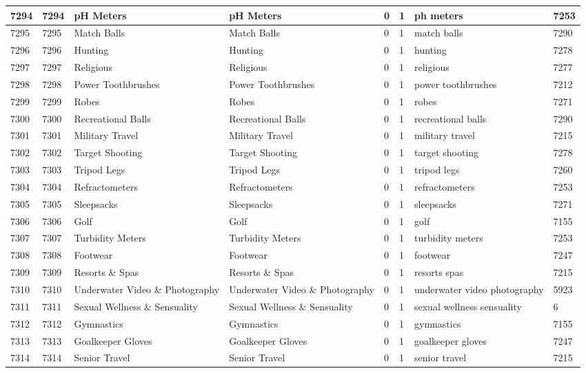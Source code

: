 \begin{longtable}{|l|l|l|l|l|l|l|l|}
7294 & 7294 & pH Meters & pH Meters & 0 & 1 & ph meters & 7253 \\ \hline 
7295 & 7295 & Match Balls & Match Balls & 0 & 1 & match balls & 7290 \\ \hline 
7296 & 7296 & Hunting & Hunting & 0 & 1 & hunting & 7278 \\ \hline 
7297 & 7297 & Religious & Religious & 0 & 1 & religious & 7277 \\ \hline 
7298 & 7298 & Power Toothbrushes & Power Toothbrushes & 0 & 1 & power toothbrushes & 7212 \\ \hline 
7299 & 7299 & Robes & Robes & 0 & 1 & robes & 7271 \\ \hline 
7300 & 7300 & Recreational Balls & Recreational Balls & 0 & 1 & recreational balls & 7290 \\ \hline 
7301 & 7301 & Military Travel & Military Travel & 0 & 1 & military travel & 7215 \\ \hline 
7302 & 7302 & Target Shooting & Target Shooting & 0 & 1 & target shooting & 7278 \\ \hline 
7303 & 7303 & Tripod Legs & Tripod Legs & 0 & 1 & tripod legs & 7260 \\ \hline 
7304 & 7304 & Refractometers & Refractometers & 0 & 1 & refractometers & 7253 \\ \hline 
7305 & 7305 & Sleepsacks & Sleepsacks & 0 & 1 & sleepsacks & 7271 \\ \hline 
7306 & 7306 & Golf & Golf & 0 & 1 & golf & 7155 \\ \hline 
7307 & 7307 & Turbidity Meters & Turbidity Meters & 0 & 1 & turbidity meters & 7253 \\ \hline 
7308 & 7308 & Footwear & Footwear & 0 & 1 & footwear & 7247 \\ \hline 
7309 & 7309 & Resorts \& Spas & Resorts \& Spas & 0 & 1 & resorts spas & 7215 \\ \hline 
7310 & 7310 & Underwater Video \& Photography & Underwater Video \& Photography & 0 & 1 & underwater video photography & 5923 \\ \hline 
7311 & 7311 & Sexual Wellness \& Sensuality & Sexual Wellness \& Sensuality & 0 & 1 & sexual wellness sensuality & 6 \\ \hline 
7312 & 7312 & Gymnastics & Gymnastics & 0 & 1 & gymnastics & 7155 \\ \hline 
7313 & 7313 & Goalkeeper Gloves & Goalkeeper Gloves & 0 & 1 & goalkeeper gloves & 7247 \\ \hline 
7314 & 7314 & Senior Travel & Senior Travel & 0 & 1 & senior travel & 7215 \\ \hline 

\end{longtable}
